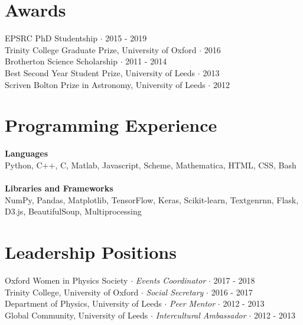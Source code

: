 \documentclass[12pt,a4paper]{article}
\newcommand{\middot}{\boldsymbol{\cdot}}
\begin{document}
\vspace{2mm}

\section*{Awards \sout{\hfill}}

\vspace{2mm}

EPSRC PhD Studentship $\middot$ 2015 - 2019 \\ 
Trinity College Graduate Prize, University of Oxford $\middot$ 2016 \\
Brotherton Science Scholarship $\middot$ 2011 - 2014 \\
Best Second Year Student Prize, University of Leeds $\middot$ 2013  \\
Scriven Bolton Prize in Astronomy, University of Leeds $\middot$ 2012

\section*{Programming Experience \sout{\hfill}}

\vspace{2mm}

\textbf{Languages} \\
Python, C++, C, Matlab, Javascript, Scheme, Mathematica, HTML, CSS, Bash \\ \\ 
\textbf{Libraries and Frameworks} \\
NumPy, Pandas, Matplotlib, TensorFlow, Keras, Scikit-learn, Textgenrnn, Flask, D3.js, BeautifulSoup, Multiprocessing

\section*{Leadership Positions \sout{\hfill}}

\vspace{2mm}

Oxford Women in Physics Society $\middot$ \textit{Events Coordinator} $\middot$ 2017 - 2018 \\ 
Trinity College, University of Oxford $\middot$ \textit{Social Secretary} $\middot$ 2016 - 2017 \\ 
Department of Physics, University of Leeds $\middot$ \textit{Peer Mentor} $\middot$ 2012 - 2013 \\ 
Global Community, University of Leeds $\middot$ \textit{Intercultural Ambassador} $\middot$ 2012 - 2013 
\end{document}
